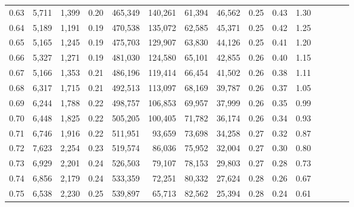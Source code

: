 \begin{tabular}{rrrcrrrrrrrrrrr}
0.63 &   5,711 &  1,399 &                                       0.20 &  465,349 &  140,261 &   61,394 &   46,562 &  0.25 &  0.43 &                         1.30 \\
0.64 &   5,189 &  1,191 &                                       0.19 &  470,538 &  135,072 &   62,585 &   45,371 &  0.25 &  0.42 &                         1.25 \\
0.65 &   5,165 &  1,245 &                                       0.19 &  475,703 &  129,907 &   63,830 &   44,126 &  0.25 &  0.41 &                         1.20 \\
0.66 &   5,327 &  1,271 &                                       0.19 &  481,030 &  124,580 &   65,101 &   42,855 &  0.26 &  0.40 &                         1.15 \\
0.67 &   5,166 &  1,353 &                                       0.21 &  486,196 &  119,414 &   66,454 &   41,502 &  0.26 &  0.38 &                         1.11 \\
0.68 &   6,317 &  1,715 &                                       0.21 &  492,513 &  113,097 &   68,169 &   39,787 &  0.26 &  0.37 &                         1.05 \\
0.69 &   6,244 &  1,788 &                                       0.22 &  498,757 &  106,853 &   69,957 &   37,999 &  0.26 &  0.35 &                         0.99 \\
0.70 &   6,448 &  1,825 &                                       0.22 &  505,205 &  100,405 &   71,782 &   36,174 &  0.26 &  0.34 &                         0.93 \\
0.71 &   6,746 &  1,916 &                                       0.22 &  511,951 &   93,659 &   73,698 &   34,258 &  0.27 &  0.32 &                         0.87 \\
0.72 &   7,623 &  2,254 &                                       0.23 &  519,574 &   86,036 &   75,952 &   32,004 &  0.27 &  0.30 &                         0.80 \\
0.73 &   6,929 &  2,201 &                                       0.24 &  526,503 &   79,107 &   78,153 &   29,803 &  0.27 &  0.28 &                         0.73 \\
0.74 &   6,856 &  2,179 &                                       0.24 &  533,359 &   72,251 &   80,332 &   27,624 &  0.28 &  0.26 &                         0.67 \\
0.75 &   6,538 &  2,230 &                                       0.25 &  539,897 &   65,713 &   82,562 &   25,394 &  0.28 &  0.24 &                         0.61 \\

\end{tabular}
